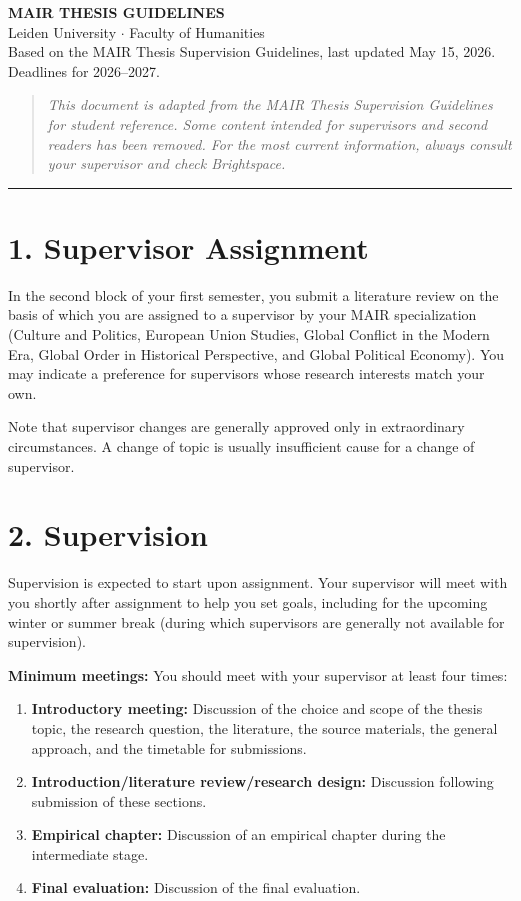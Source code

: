 \documentclass[11pt,a4paper]{article}
\begin{document}
\begin{center}
{\Large\bfseries MAIR THESIS GUIDELINES}\\[0.3em]
{\normalsize Leiden University $\cdot$ Faculty of Humanities}\\[0.3em]
{\small Based on the MAIR Thesis Supervision Guidelines, last updated May 15, 2026. Deadlines for 2026--2027.}\\[1.5em]
\end{center}

\begin{quote}
\small\textit{This document is adapted from the MAIR Thesis Supervision Guidelines for student reference. Some content intended for supervisors and second readers has been removed. For the most current information, always consult your supervisor and check Brightspace.}
\end{quote}

\bigskip
\hrule
\bigskip

\section{1. Supervisor Assignment}

In the second block of your first semester, you submit a literature review on the basis of which you are assigned to a supervisor by your MAIR specialization (Culture and Politics, European Union Studies, Global Conflict in the Modern Era, Global Order in Historical Perspective, and Global Political Economy). You may indicate a preference for supervisors whose research interests match your own.

Note that supervisor changes are generally approved only in extraordinary circumstances. A change of topic is usually insufficient cause for a change of supervisor.

\section{2. Supervision}

Supervision is expected to start upon assignment. Your supervisor will meet with you shortly after assignment to help you set goals, including for the upcoming winter or summer break (during which supervisors are generally not available for supervision).

\textbf{Minimum meetings:} You should meet with your supervisor at least four times:

\begin{enumerate}
    \item \textbf{Introductory meeting:} Discussion of the choice and scope of the thesis topic, the research question, the literature, the source materials, the general approach, and the timetable for submissions.
    \item \textbf{Introduction/literature review/research design:} Discussion following submission of these sections.
    \item \textbf{Empirical chapter:} Discussion of an empirical chapter during the intermediate stage.
    \item \textbf{Final evaluation:} Discussion of the final evaluation.
\end{enumerate}
\end{document}
